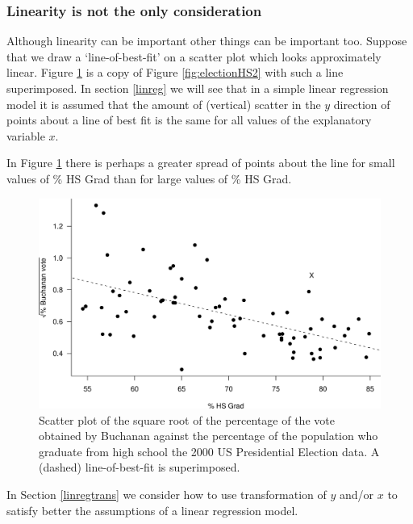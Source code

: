 \documentclass[
  british,
]{book}
\begin{document}
\hypertarget{linearity-is-not-the-only-consideration}{%
\subsubsection*{Linearity is not the only consideration}\label{linearity-is-not-the-only-consideration}}

Although linearity can be important other things can be important too. Suppose that we draw a `line-of-best-fit' on a scatter plot which looks approximately linear. Figure \ref{fig:electionHS3} is a copy of Figure \ref{fig:electionHS2} with such a line superimposed. In section \ref{linreg} we will see that in a simple linear regression model it is assumed that the amount of (vertical) scatter in the \(y\) direction of points about a line of best fit is the same for all values of the explanatory variable \(x\).

In Figure \ref{fig:electionHS3} there is perhaps a greater spread of points about the line for small values of \% HS Grad than for large values of \% HS Grad.

\begin{figure}

{\centering \includegraphics[width=0.8\linewidth]{images/election_HS3} 

}

\caption{Scatter plot of the square root of the percentage of the vote obtained by Buchanan against the percentage of the population who graduate from high school the 2000 US Presidential Election data.  A (dashed) line-of-best-fit is superimposed.}\label{fig:electionHS3}
\end{figure}
\FloatBarrier

In Section \ref{linregtrans} we consider how to use transformation of \(y\) and/or \(x\) to satisfy better the assumptions of a linear regression model.
\end{document}
